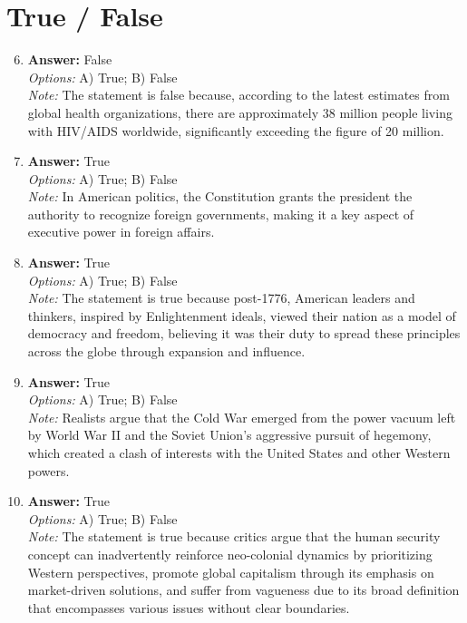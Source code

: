 \documentclass[12pt]{article}
\begin{document}
\section*{True / False}
\begin{enumerate}[label=\arabic*.]
\setcounter{enumi}{5}
\item \textbf{Answer:} False
\\ \textit{Options:} A) True; B) False
\\ \textit{Note:} The statement is false because, according to the latest estimates from global health organizations, there are approximately 38 million people living with HIV/AIDS worldwide, significantly exceeding the figure of 20 million.
\item \textbf{Answer:} True
\\ \textit{Options:} A) True; B) False
\\ \textit{Note:} In American politics, the Constitution grants the president the authority to recognize foreign governments, making it a key aspect of executive power in foreign affairs.
\item \textbf{Answer:} True
\\ \textit{Options:} A) True; B) False
\\ \textit{Note:} The statement is true because post-1776, American leaders and thinkers, inspired by Enlightenment ideals, viewed their nation as a model of democracy and freedom, believing it was their duty to spread these principles across the globe through expansion and influence.
\item \textbf{Answer:} True
\\ \textit{Options:} A) True; B) False
\\ \textit{Note:} Realists argue that the Cold War emerged from the power vacuum left by World War II and the Soviet Union's aggressive pursuit of hegemony, which created a clash of interests with the United States and other Western powers.
\item \textbf{Answer:} True
\\ \textit{Options:} A) True; B) False
\\ \textit{Note:} The statement is true because critics argue that the human security concept can inadvertently reinforce neo-colonial dynamics by prioritizing Western perspectives, promote global capitalism through its emphasis on market-driven solutions, and suffer from vagueness due to its broad definition that encompasses various issues without clear boundaries.
\end{enumerate}
\end{document}
